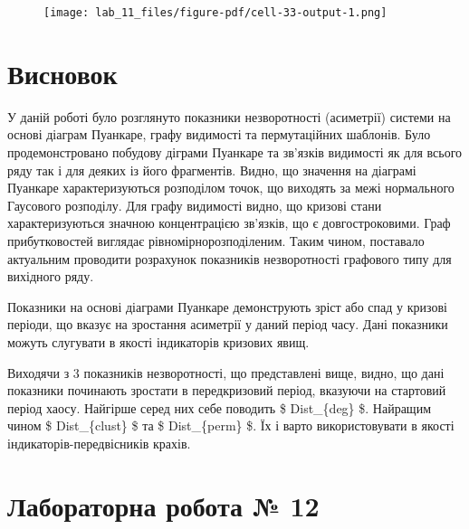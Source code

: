 \documentclass[
  letterpaper,
]{report}
\begin{document}
\begin{figure}[H]

{\centering \texttt{[image: lab\_11\_files/figure-pdf/cell-33-output-1.png]}

}

\end{figure}


\hypertarget{ux432ux438ux441ux43dux43eux432ux43eux43a-1}{%
\chapter{Висновок}\label{ux432ux438ux441ux43dux43eux432ux43eux43a-1}}

У даній роботі було розглянуто показники незворотності (асиметрії)
системи на основі діаграм Пуанкаре, графу видимості та пермутаційних
шаблонів. Було продемонстровано побудову діграми Пуанкаре та зв'язків
видимості як для всього ряду так і для деяких із його фрагментів. Видно,
що значення на діаграмі Пуанкаре характеризуються розподілом точок, що
виходять за межі нормального Гаусового розподілу. Для графу видимості
видно, що кризові стани характеризуються значною концентрацією зв'язків,
що є довгостроковими. Граф прибутковостей виглядає
рівномірнорозподіленим. Таким чином, поставало актуальним проводити
розрахунок показників незворотності графового типу для вихідного ряду.

Показники на основі діаграми Пуанкаре демонструють зріст або спад у
кризові періоди, що вказує на зростання асиметрії у даний період часу.
Дані показники можуть слугувати в якості індикаторів кризових явищ.

Виходячи з 3 показників незворотності, що представлені вище, видно, що
дані показники починають зростати в передкризовий період, вказуючи на
стартовий період хаосу. Найгірше серед них себе поводить \$
Dist\_\{deg\} \$. Найращим чином \$ Dist\_\{clust\} \$ та \$
Dist\_\{perm\} \$. Їх і варто використовувати в якості
індикаторів-передвісників крахів.


\hypertarget{ux43bux430ux431ux43eux440ux430ux442ux43eux440ux43dux430-ux440ux43eux431ux43eux442ux430-12}{%
\chapter{Лабораторна робота №
12}\label{ux43bux430ux431ux43eux440ux430ux442ux43eux440ux43dux430-ux440ux43eux431ux43eux442ux430-12}}
\end{document}
